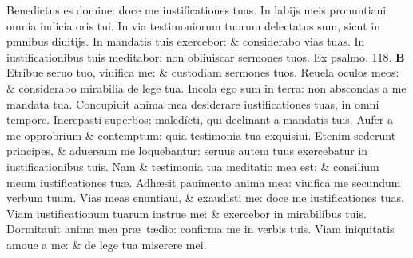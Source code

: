 \documentclass[a5paper,10pt]{book}
\def\ae{æ}
\begin{document}
\begin{multicols*}{2}
\newline \color{red} B\color{black}enedictus es domine: doce me iustificationes tuas.
\newline \color{red} I\color{black}n labijs meis pronuntiaui omnia iudicia oris tui.
\newline \color{red} I\color{black}n via testimoniorum tuorum delectatus sum, sicut in pmnibus diuitijs.
\newline \color{red} I\color{black}n mandatis tuis exercebor: \& considerabo vias tuas.
\newline \color{red} I\color{black}n iustificationibus tuis meditabor: non obliuiscar sermones tuos. 
\newline \color{red} Ex psalmo. 118. \color{black}
\vspace{-1em}
\lettrine[lines=2]{\bfseries \color{red} B}{}
Etribue seruo tuo, viuifica me: \& custodiam sermones tuos.
\newline \color{red} R\color{black}euela oculos meos: \& considerabo mirabilia de lege tua.
\newline \color{red} I\color{black}ncola ego sum in terra: non abscondas a me mandata tua.
\newline \color{red} C\color{black}oncupiuit anima mea desiderare iustificationes tuas, in omni tempore.
\newline \color{red} I\color{black}ncrepasti superbos: maledícti, qui declinant a mandatis tuis.
\newline \color{red} A\color{black}ufer a me opprobrium \& contemptum: quia testimonia tua exquisiui.
\newline \color{red} E\color{black}tenim sederunt principes, \& aduersum me loquebantur: seruus autem tuus exercebatur in iustificationibus tuis.
\newline \color{red} N\color{black}am \& testimonia tua meditatio mea est: \& consilium meum iustificationes tu\ae .
\newline \color{red} A\color{black}dh\ae sit pauimento anima mea: viuifica me secundum verbum tuum.
\newline \color{red} V\color{black}ias meas enuntiaui, \& exaudisti me: doce me iustificationes tuas.
\newline \color{red} V\color{black}iam iustificationum tuarum instrue me: \& exercebor in mirabilibus tuis.
\newline \color{red} D\color{black}ormitauit anima mea pr\ae \ t\ae dio: confirma me in verbis tuis.
\newline \color{red} V\color{black}iam iniquitatis amoue a me: \& de lege tua miserere mei.

\end{multicols*}
\end{document}

